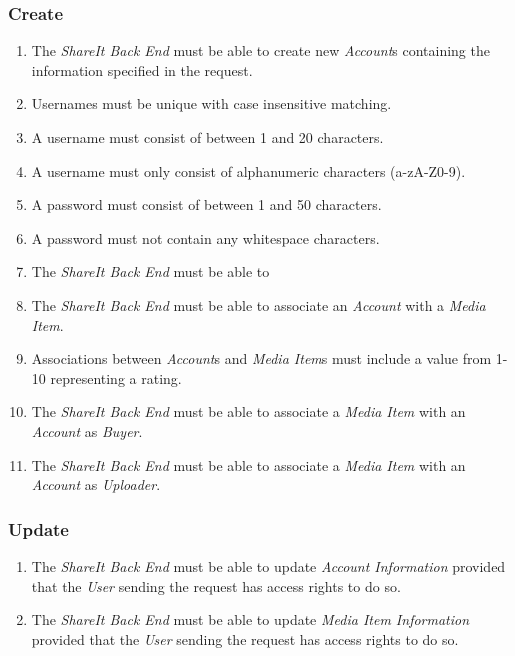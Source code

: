 \subsubsection{Create}
\begin{enumerate}[label=FR-\twodigits*,resume]

\item The \textit{ShareIt Back End} must be able to create new \textit{Account}s containing the information specified in the request.

\item Usernames must be unique with case insensitive matching.

\item A username must consist of between 1 and 20 characters.

\item A username must only consist of alphanumeric characters (a-zA-Z0-9).

\item A password must consist of between 1 and 50 characters. 

\item A password must not contain any whitespace characters.

\item The \textit{ShareIt Back End} must be able to 

\item The \textit{ShareIt Back End} must be able to associate an \textit{Account} with a \textit{Media Item}.

\item Associations between \textit{Account}s and \textit{Media Item}s must include a value from 1-10 representing a rating.

\item The \textit{ShareIt Back End} must be able to associate a \textit{Media Item} with an \textit{Account} as \textit{Buyer}.

\item The \textit{ShareIt Back End} must be able to associate a \textit{Media Item} with an \textit{Account} as \textit{Uploader}.
\end{enumerate}

\subsubsection{Update}
\begin{enumerate}[label=FR-\twodigits*,resume]

\item The \textit{ShareIt Back End} must be able to update \textit{Account Information} provided that the \textit{User} sending the request has access rights to do so.

\item The \textit{ShareIt Back End} must be able to update \textit{Media Item Information} provided that the \textit{User} sending the request has access rights to do so.
\end{enumerate}

